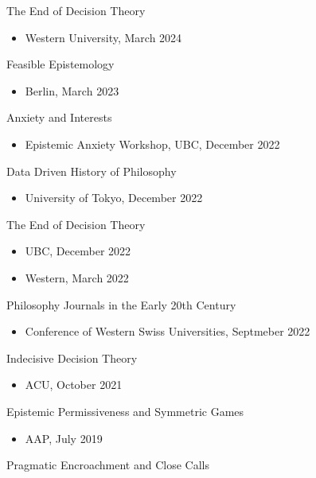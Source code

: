 \documentclass[
  10pt,
  letterpaper,
  DIV=11,
  numbers=noendperiod,
  twoside]{scrartcl}
\providecommand{\tightlist}{%
  \setlength{\itemsep}{0pt}\setlength{\parskip}{0pt}}\usepackage{longtable,booktabs,array}
\begin{document}
The End of Decision Theory

\begin{itemize}
\tightlist
\item
  Western University, March 2024
\end{itemize}

Feasible Epistemology

\begin{itemize}
\tightlist
\item
  Berlin, March 2023
\end{itemize}

Anxiety and Interests

\begin{itemize}
\tightlist
\item
  Epistemic Anxiety Workshop, UBC, December 2022
\end{itemize}

Data Driven History of Philosophy

\begin{itemize}
\tightlist
\item
  University of Tokyo, December 2022
\end{itemize}

The End of Decision Theory

\begin{itemize}
\tightlist
\item
  UBC, December 2022
\item
  Western, March 2022
\end{itemize}

Philosophy Journals in the Early 20th Century

\begin{itemize}
\tightlist
\item
  Conference of Western Swiss Universities, Septmeber 2022
\end{itemize}

Indecisive Decision Theory

\begin{itemize}
\tightlist
\item
  ACU, October 2021
\end{itemize}

Epistemic Permissiveness and Symmetric Games

\begin{itemize}
\tightlist
\item
  AAP, July 2019
\end{itemize}

Pragmatic Encroachment and Close Calls
\end{document}
